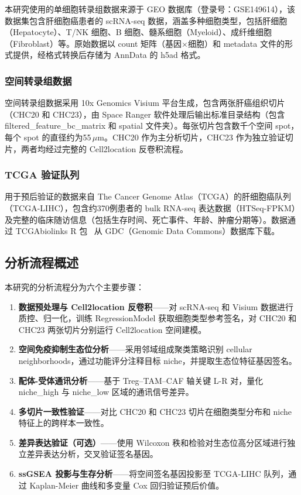 \documentclass[12pt, a4paper]{ctexart}
\begin{document}
本研究使用的单细胞转录组数据来源于 GEO 数据库（登录号：GSE149614），该数据集包含肝细胞癌患者的 scRNA-seq 数据，涵盖多种细胞类型，包括肝细胞（Hepatocyte）、T/NK 细胞、B 细胞、髓系细胞（Myeloid）、成纤维细胞（Fibroblast）等。原始数据以 count 矩阵（基因$\times$细胞）和 metadata 文件的形式提供，经格式转换后存储为 AnnData 的 h5ad 格式。

\subsubsection{空间转录组数据}

空间转录组数据采用 10x Genomics Visium 平台生成，包含两张肝癌组织切片（CHC20 和 CHC23），由 Space Ranger 软件处理后输出标准目录结构（包含 filtered\_feature\_bc\_matrix 和 spatial 文件夹）。每张切片包含数千个空间 spot，每个 spot 的直径约为55\,$\mu$m。CHC20 作为主分析切片，CHC23 作为独立验证切片，两者均经过完整的 Cell2location 反卷积流程。

\subsubsection{TCGA 验证队列}

用于预后验证的数据来自 The Cancer Genome Atlas（TCGA）的肝细胞癌队列（TCGA-LIHC），包含约370例患者的 bulk RNA-seq 表达数据（HTSeq-FPKM）及完整的临床随访信息（包括生存时间、死亡事件、年龄、肿瘤分期等）。数据通过 TCGAbiolinks R 包~\cite{colaprico2016tcgabiolinks} 从 GDC（Genomic Data Commons）数据库下载。

\subsection{分析流程概述}

本研究的分析流程分为六个主要步骤：

\begin{enumerate}[label=\textbf{Step \arabic*:}]
    \item \textbf{数据预处理与 Cell2location 反卷积}——对 scRNA-seq 和 Visium 数据进行质控、归一化，训练 RegressionModel 获取细胞类型参考签名，对 CHC20 和 CHC23 两张切片分别运行 Cell2location 空间建模。
    \item \textbf{空间免疫抑制生态位分析}——采用邻域组成聚类策略识别 cellular neighborhoods，通过功能评分注释目标 niche，并提取生态位特征基因签名。
    \item \textbf{配体-受体通讯分析}——基于 Treg--TAM--CAF 轴关键 L-R 对，量化 niche_high 与 niche_low 区域的通讯信号差异。
    \item \textbf{多切片一致性验证}——对比 CHC20 和 CHC23 切片在细胞类型分布和 niche 特征上的跨样本一致性。
    \item \textbf{差异表达验证（可选）}——使用 Wilcoxon 秩和检验对生态位高分区域进行独立差异表达分析，交叉验证签名基因。
    \item \textbf{ssGSEA 投影与生存分析}——将空间签名基因投影至 TCGA-LIHC 队列，通过 Kaplan-Meier 曲线和多变量 Cox 回归验证预后价值。
\end{enumerate}
\end{document}
